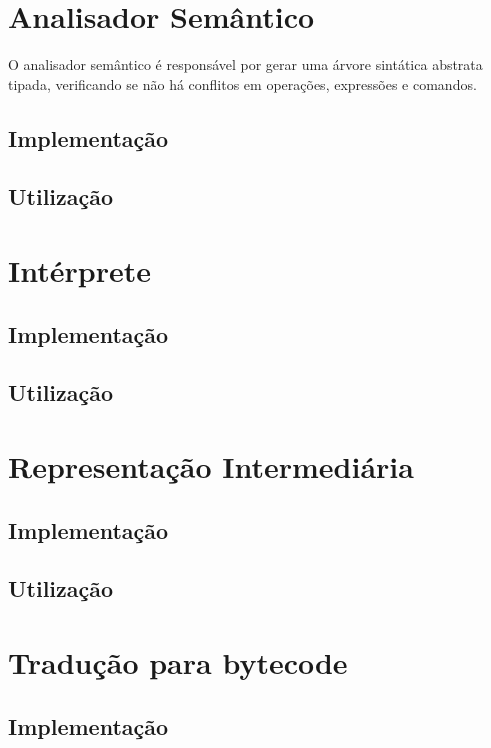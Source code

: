 \documentclass[12pt,a4paper,twoside]{report}
\begin{document}
\section{Analisador Semântico}
O analisador semântico é responsável por gerar uma árvore sintática abstrata tipada, verificando se não há conflitos
em operações, expressões e comandos. 

\subsection{Implementação}

\subsection{Utilização}


\section{Intérprete}

\subsection{Implementação}

\subsection{Utilização}


\section{Representação Intermediária}

\subsection{Implementação}

\subsection{Utilização}


\section{Tradução para bytecode}

\subsection{Implementação}
\end{document}

